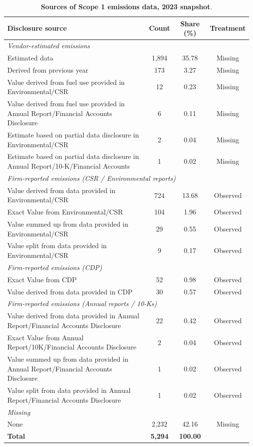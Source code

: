 \documentclass[a4paper,12pt]{article}
\begin{document}
\clearpage

\begin{landscape}
\begin{table}[h!]
\centering
\caption{\textbf{Sources of Scope 1 emissions data, 2023 snapshot}.}
\label{tab:emissions_sources}
\begin{tabular}{lccc}
\toprule
\textbf{Disclosure source} & \textbf{Count} & \textbf{Share (\%)} & \textbf{Treatment} \\
\midrule
\multicolumn{4}{l}{\textit{Vendor-estimated emissions}} \\
Estimated data & 1{,}894 & 35.78 & Missing \\
Derived from previous year & 173 & 3.27 & Missing \\
Value derived from fuel use provided in Environmental/CSR & 12 & 0.23 & Missing \\
Value derived from fuel use provided in Annual Report/Financial Accounts Disclosure & 6 & 0.11 & Missing \\
Estimate based on partial data disclosure in Environmental/CSR & 2 & 0.04 & Missing \\
Estimate based on partial data disclosure in Annual Report/10-K/Financial Accounts & 1 & 0.02 & Missing \\
\midrule
\multicolumn{4}{l}{\textit{Firm-reported emissions (CSR / Environmental reports)}} \\
Value derived from data provided in Environmental/CSR & 724 & 13.68 & Observed \\
Exact Value from Environmental/CSR & 104 & 1.96 & Observed \\
Value summed up from data provided in Environmental/CSR & 29 & 0.55 & Observed \\
Value split from data provided in Environmental/CSR & 9 & 0.17 & Observed \\
\midrule
\multicolumn{4}{l}{\textit{Firm-reported emissions (CDP)}} \\
Exact Value from CDP & 52 & 0.98 & Observed \\
Value derived from data provided in CDP & 30 & 0.57 & Observed \\
\midrule
\multicolumn{4}{l}{\textit{Firm-reported emissions (Annual reports / 10-Ks)}} \\
Value derived from data provided in Annual Report/Financial Accounts Disclosure & 22 & 0.42 & Observed \\
Exact Value from Annual Report/10K/Financial Accounts Disclosure & 2 & 0.04 & Observed \\
Value summed up from data provided in Annual Report/Financial Accounts Disclosure & 1 & 0.02 & Observed \\
Value split from data provided in Annual Report/Financial Accounts Disclosure & 1 & 0.02 & Observed \\
\midrule
\multicolumn{4}{l}{\textit{Missing}} \\
None & 2{,}232 & 42.16 & Missing \\
\midrule
\textbf{Total} & \textbf{5,294} & \textbf{100.00} & \\
\bottomrule
\end{tabular}
\end{table}
\end{landscape}
\end{document}
